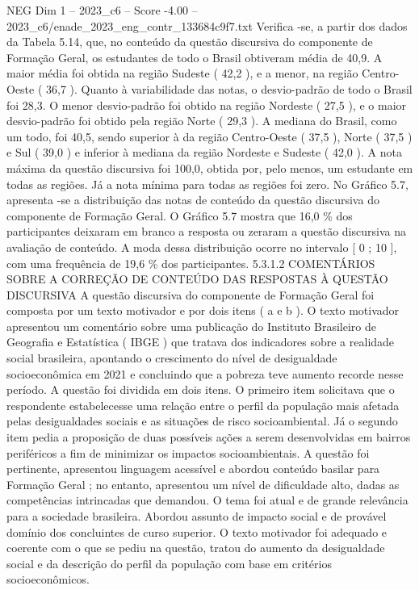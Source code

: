 \begin{textsample}{NEG Dim 1 – 2023\_c6 – Score -4.00 – 2023\_c6/enade\_2023\_eng\_contr\_133684c9f7.txt}
Verifica -se, a partir dos dados da Tabela 5.14, que, no conteúdo da questão discursiva do componente de Formação Geral, os estudantes de todo o Brasil obtiveram média de 40,9.
A maior média foi obtida na região Sudeste ( 42,2 ), e a menor, na região Centro-Oeste ( 36,7 ).
Quanto à variabilidade das notas, o desvio-padrão de todo o Brasil foi 28,3.
O menor desvio-padrão foi obtido na região Nordeste ( 27,5 ), e o maior desvio-padrão foi obtido pela região Norte ( 29,3 ).
A mediana do Brasil, como um todo, foi 40,5, sendo superior à da região Centro-Oeste ( 37,5 ), Norte ( 37,5 ) e Sul ( 39,0 ) e inferior à mediana da região Nordeste e Sudeste ( 42,0 ).
A nota máxima da questão discursiva foi 100,0, obtida por, pelo menos, um estudante em todas as regiões.
Já a nota mínima para todas as regiões foi zero.
No Gráfico 5.7, apresenta -se a distribuição das notas de conteúdo da questão discursiva do componente de Formação Geral.
O Gráfico 5.7 mostra que 16,0 \% dos participantes deixaram em branco a resposta ou zeraram a questão discursiva na avaliação de conteúdo.
A moda dessa distribuição ocorre no intervalo [ 0 ; 10 ], com uma frequência de 19,6 \% dos participantes. 5.3.1.2 COMENTÁRIOS SOBRE A CORREÇÃO DE CONTEÚDO DAS RESPOSTAS À QUESTÃO DISCURSIVA A questão discursiva do componente de Formação Geral foi composta por um texto motivador e por dois itens ( a e b ).
O texto motivador apresentou um comentário sobre uma publicação do Instituto Brasileiro de Geografia e Estatística ( IBGE ) que tratava dos indicadores sobre a realidade social brasileira, apontando o crescimento do nível de desigualdade socioeconômica em 2021 e concluindo que a pobreza teve aumento recorde nesse período.
A questão foi dividida em dois itens.
O primeiro item solicitava que o respondente estabelecesse uma relação entre o perfil da população mais afetada pelas desigualdades sociais e as situações de risco socioambiental.
Já o segundo item pedia a proposição de duas possíveis ações a serem desenvolvidas em bairros periféricos a fim de minimizar os impactos socioambientais.
A questão foi pertinente, apresentou linguagem acessível e abordou conteúdo basilar para Formação Geral ; no entanto, apresentou um nível de dificuldade alto, dadas as competências intrincadas que demandou.
O tema foi atual e de grande relevância para a sociedade brasileira.
Abordou assunto de impacto social e de provável domínio dos concluintes de curso superior.
O texto motivador foi adequado e coerente com o que se pediu na questão, tratou do aumento da desigualdade social e da descrição do perfil da população com base em critérios socioeconômicos.

\end{textsample}
